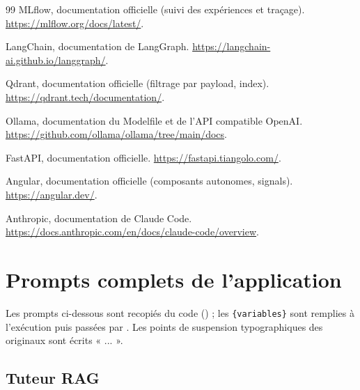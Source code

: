 \documentclass[12pt,a4paper]{report}
\DeclareRobustCommand{\code}[1]{\texttt{\codecasse{#1}}}
\begin{document}
\begin{thebibliography}{99}
 MLflow, documentation officielle (suivi des expériences et traçage).
\url{https://mlflow.org/docs/latest/}.

 LangChain, documentation de LangGraph. \url{https://langchain-ai.github.io/langgraph/}.

 Qdrant, documentation officielle (filtrage par payload, index). \url{https://qdrant.tech/documentation/}.

 Ollama, documentation du Modelfile et de l'API compatible OpenAI.
\url{https://github.com/ollama/ollama/tree/main/docs}.

 FastAPI, documentation officielle. \url{https://fastapi.tiangolo.com/}.

 Angular, documentation officielle (composants autonomes, signals). \url{https://angular.dev/}.

 Anthropic, documentation de Claude Code. \url{https://docs.anthropic.com/en/docs/claude-code/overview}.

\end{thebibliography}

\appendix

\chapter{Prompts complets de l'application}
\label{ann:prompts}

Les prompts ci-dessous sont recopiés du code (\code{backend/app}) ; les \texttt{\{variables\}} sont remplies
à l'exécution puis passées par \code{mask_pii}. Les points de suspension typographiques des originaux sont
écrits « ... ».

\section{Tuteur RAG}
\end{document}
